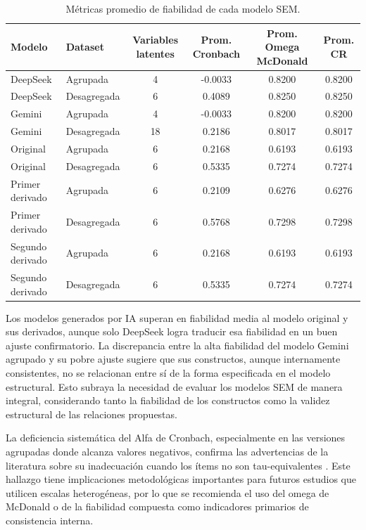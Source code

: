 \documentclass[conference]{IEEEtran}
\begin{document}
\begin{table}[!htb]
\centering
\footnotesize
\begin{tabular}{p{2.8cm}p{2.2cm}cccc}
\toprule
\textbf{Modelo} & \textbf{Dataset} & \textbf{Variables latentes} & 
\textbf{Prom. Cronbach} & \textbf{Prom. Omega McDonald} & \textbf{Prom. CR} \\
\midrule
DeepSeek & Agrupada & 4 & -0.0033 & 0.8200 & 0.8200 \\
DeepSeek & Desagregada & 6 & 0.4089 & 0.8250 & 0.8250 \\
Gemini & Agrupada & 4 & -0.0033 & 0.8200 & 0.8200 \\
Gemini & Desagregada & 18 & 0.2186 & 0.8017 & 0.8017 \\
Original & Agrupada & 6 & 0.2168 & 0.6193 & 0.6193 \\
Original & Desagregada & 6 & 0.5335 & 0.7274 & 0.7274 \\
Primer derivado & Agrupada & 6 & 0.2109 & 0.6276 & 0.6276 \\
Primer derivado & Desagregada & 6 & 0.5768 & 0.7298 & 0.7298 \\
Segundo derivado & Agrupada & 6 & 0.2168 & 0.6193 & 0.6193 \\
Segundo derivado & Desagregada & 6 & 0.5335 & 0.7274 & 0.7274 \\
\bottomrule
\end{tabular}
\caption{Métricas promedio de fiabilidad de cada modelo SEM.}
\label{tab:fiabilidad}
\end{table}

Los modelos generados por IA superan en fiabilidad media al modelo original y sus derivados, aunque solo DeepSeek logra traducir esa fiabilidad en un buen ajuste confirmatorio. La discrepancia entre la alta fiabilidad del modelo Gemini agrupado y su pobre ajuste sugiere que sus constructos, aunque internamente consistentes, no se relacionan entre sí de la forma especificada en el modelo estructural. Esto subraya la necesidad de evaluar los modelos SEM de manera integral, considerando tanto la fiabilidad de los constructos como la validez estructural de las relaciones propuestas.

La deficiencia sistemática del Alfa de Cronbach, especialmente en las versiones agrupadas donde alcanza valores negativos, confirma las advertencias de la literatura sobre su inadecuación cuando los ítems no son tau-equivalentes \cite{mcdonald1999test}. Este hallazgo tiene implicaciones metodológicas importantes para futuros estudios que utilicen escalas heterogéneas, por lo que se recomienda el uso del omega de McDonald o de la fiabilidad compuesta como indicadores primarios de consistencia interna.
\end{document}
